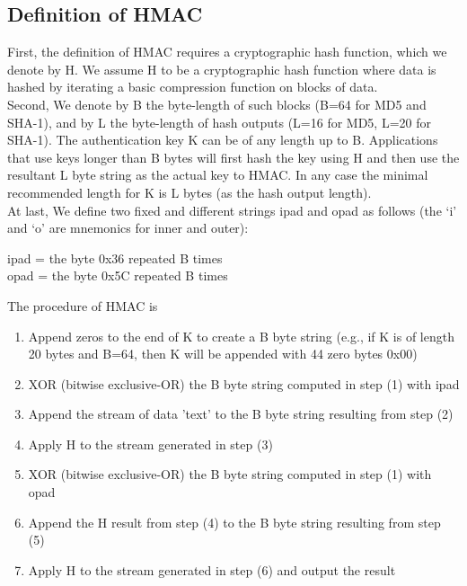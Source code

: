 \documentclass[12pt,a4paper,oneside]{report}
\begin{document}
\subsection{Definition of HMAC}
First, the definition of HMAC requires a cryptographic hash function, which we denote by H. We assume H to be a cryptographic hash function where data is hashed by iterating a basic compression function on blocks of data.\\

Second, We denote by B the byte-length of such blocks (B=64 for MD5 and SHA-1), and by L the byte-length of hash outputs (L=16 for MD5, L=20 for SHA-1). The authentication key K can be of any length up to B. Applications that use keys longer than B bytes will first hash the key using H and then use the resultant L byte string as the actual key to HMAC. In any case the minimal recommended length for K is L bytes (as the hash output length).\\

At last, We define two fixed and different strings ipad and opad as follows (the `i' and `o' are mnemonics for inner and outer):
\begin{center}
ipad = the byte 0x36 repeated B times\\
opad = the byte 0x5C repeated B times
\end{center}

The procedure of HMAC is
\begin{enumerate}[(1)]
    \item Append zeros to the end of K to create a B byte string
        (e.g., if K is of length 20 bytes and B=64, then K will be
         appended with 44 zero bytes 0x00)
    \item XOR (bitwise exclusive-OR) the B byte string computed in step
        (1) with ipad
    \item Append the stream of data 'text' to the B byte string resulting
        from step (2)
    \item Apply H to the stream generated in step (3)
    \item XOR (bitwise exclusive-OR) the B byte string computed in
        step (1) with opad
    \item Append the H result from step (4) to the B byte string
        resulting from step (5)
    \item Apply H to the stream generated in step (6) and output
        the result
\end{enumerate}
\end{document}
